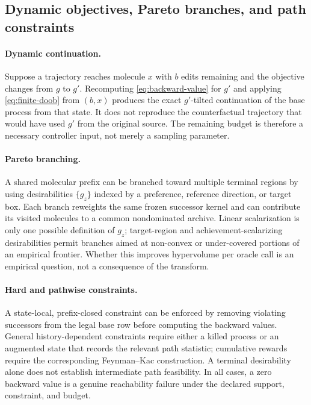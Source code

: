 \documentclass[10pt,letterpaper]{article}
\begin{document}
\subsection{Dynamic objectives, Pareto branches, and path constraints}

\paragraph{Dynamic continuation.}
Suppose a trajectory reaches molecule $x$ with $b$ edits remaining and the
objective changes from $g$ to $g'$. Recomputing
\eqref{eq:backward-value} for $g'$ and applying
\eqref{eq:finite-doob} from $(b,x)$ produces the exact $g'$-tilted
continuation of the base process from that state. It does not reproduce the
counterfactual trajectory that would have used $g'$ from the original source.
The remaining budget is therefore a necessary controller input, not merely a
sampling parameter.

\paragraph{Pareto branching.}
A shared molecular prefix can be branched toward multiple terminal regions by
using desirabilities $\{g_z\}$ indexed by a preference, reference direction,
or target box. Each branch reweights the same frozen successor kernel and can
contribute its visited molecules to a common nondominated archive. Linear
scalarization is only one possible definition of $g_z$; target-region and
achievement-scalarizing desirabilities permit branches aimed at non-convex or
under-covered portions of an empirical frontier. Whether this improves
hypervolume per oracle call is an empirical question, not a consequence of
the transform.

\paragraph{Hard and pathwise constraints.}
A state-local, prefix-closed constraint can be enforced by removing violating
successors from the legal base row before computing the backward values.
General history-dependent constraints require either a killed process or an
augmented state that records the relevant path statistic; cumulative rewards
require the corresponding Feynman--Kac construction. A terminal desirability
alone does not establish intermediate path feasibility. In all cases, a
zero backward value is a genuine reachability failure under the declared
support, constraint, and budget.
\end{document}
